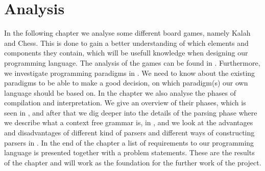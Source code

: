 \chapter{Analysis}
\label{chap:analysis}
In the following chapter we analyse some different board games, namely Kalah and Chess. This is done to gain a better understanding of which elements and components they contain, which will be usefull knowledge when designing our programming language. The analysis of the games can be found in . Furthermore, we investigate programming paradigms in . We need to know about the existing paradigms to be able to make a good decision, on which paradigm(s) our own language should be based on. In the chapter we also analyse the phases of compilation and interpretation. We give an overview of their phases, which is seen in , and after that we dig deeper into the details of the parsing phase where we describe what a context free grammar is, in , and we look at the advantages and disadvantages of different kind of parsers and different ways of constructing parsers in . In the end of the chapter a list of requirements to our programming language is presented together with a problem statements. These are the results of the chapter and will work as the foundation for the further work of the project.





%



%

